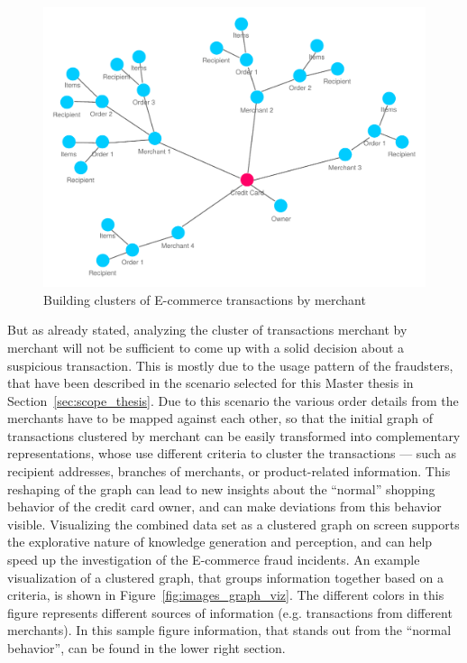 \begin{figure}[!ht]
  \centering
  \includegraphics[width=0.9\columnwidth]{images/ontology_scenario_2.pdf}
  \caption{Building clusters of E-commerce transactions by merchant}
\label{fig:images_credit_card_graph}
\end{figure}

But as already stated, analyzing the cluster of transactions merchant by merchant will not be sufficient to come up with a solid decision about a suspicious transaction. This is mostly due to the usage pattern of the fraudsters, that have been described in the scenario selected for this Master thesis in Section~\ref{sec:scope_thesis}. Due to this scenario the various order details from the merchants have to be mapped against each other, so that the initial graph of transactions clustered by merchant can be easily transformed into complementary representations, whose use different criteria to cluster the transactions --- such as recipient addresses, branches of merchants, or product-related information. This reshaping of the graph can lead to new insights about the ``normal'' shopping behavior of the credit card owner, and can make deviations from this behavior visible. Visualizing the combined data set as a clustered graph on screen supports the explorative nature of knowledge generation and perception, and can help speed up the investigation of the \gls{E-commerce} fraud incidents. An example visualization of a clustered graph, that groups information together based on a criteria, is shown in Figure~\ref{fig:images_graph_viz}. The different colors in this figure represents different sources of information (e.g. transactions from different merchants). In this sample figure information, that stands out from the ``normal behavior'', can be found in the lower right section. \\

